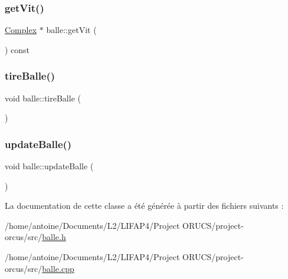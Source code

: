 \subsubsection{\texorpdfstring{get\+Vit()}{getVit()}}
{\footnotesize\ttfamily \hyperlink{classComplex}{Complex} $\ast$ balle\+::get\+Vit (\begin{DoxyParamCaption}{ }\end{DoxyParamCaption}) const}

\mbox{\label{classballe_a05c341df96e2a49b08e8a77c9a6806db}} 
\subsubsection{\texorpdfstring{tire\+Balle()}{tireBalle()}}
{\footnotesize\ttfamily void balle\+::tire\+Balle (\begin{DoxyParamCaption}{ }\end{DoxyParamCaption})}

\mbox{\label{classballe_a4bbd5e8cc842b10009b279d77d7272ef}} 
\subsubsection{\texorpdfstring{update\+Balle()}{updateBalle()}}
{\footnotesize\ttfamily void balle\+::update\+Balle (\begin{DoxyParamCaption}{ }\end{DoxyParamCaption})}



La documentation de cette classe a été générée à partir des fichiers suivants \+:\begin{DoxyCompactItemize}
\item 
/home/antoine/\+Documents/\+L2/\+L\+I\+F\+A\+P4/\+Project O\+R\+U\+C\+S/project-\/orcus/src/\hyperlink{balle_8h}{balle.\+h}\item 
/home/antoine/\+Documents/\+L2/\+L\+I\+F\+A\+P4/\+Project O\+R\+U\+C\+S/project-\/orcus/src/\hyperlink{balle_8cpp}{balle.\+cpp}\end{DoxyCompactItemize}
